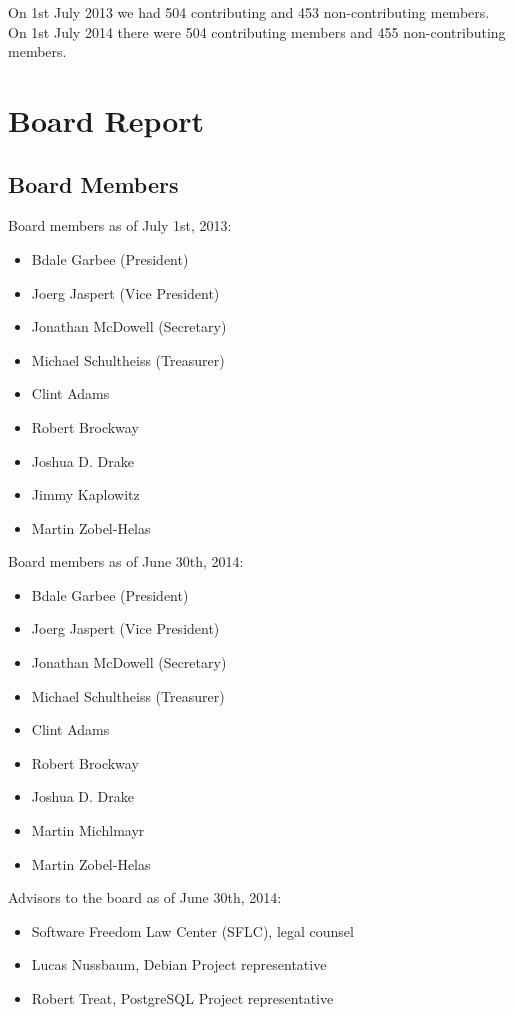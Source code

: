 \documentclass[letterpaper]{report}
\begin{document}
On 1st July 2013 we had 504 contributing and 453 non-contributing members. On
1st July 2014 there were 504 contributing members and 455 non-contributing
members.


\chapter{Board Report}
\section{Board Members}

Board members as of July 1st, 2013:

\begin{itemize}
\item Bdale Garbee (President)
\item Joerg Jaspert (Vice President)
\item Jonathan McDowell (Secretary)
\item Michael Schultheiss (Treasurer)
\item Clint Adams
\item Robert Brockway
\item Joshua D. Drake
\item Jimmy Kaplowitz
\item Martin Zobel-Helas
\end{itemize}

Board members as of June 30th, 2014:

\begin{itemize}
\item Bdale Garbee (President)
\item Joerg Jaspert (Vice President)
\item Jonathan McDowell (Secretary)
\item Michael Schultheiss (Treasurer)
\item Clint Adams
\item Robert Brockway
\item Joshua D. Drake
\item Martin Michlmayr
\item Martin Zobel-Helas
\end{itemize}

Advisors to the board as of June 30th, 2014:

\begin{itemize}
\item Software Freedom Law Center (SFLC), legal counsel
\item Lucas Nussbaum, Debian Project representative
\item Robert Treat, PostgreSQL Project representative
\end{itemize}
\end{document}
